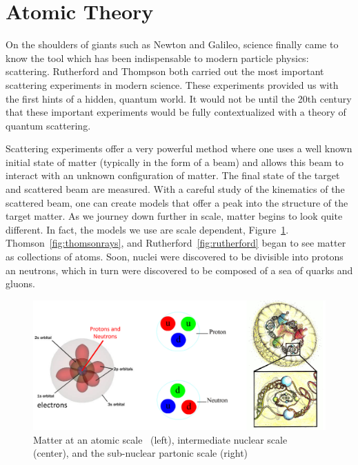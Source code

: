 \clearpage
\section{Atomic Theory}

On the shoulders of giants such as Newton and Galileo, science finally came to
know the tool which has been indispensable to modern particle physics:
scattering. Rutherford and Thompson both carried out the most important
scattering experiments in modern science. These experiments provided us with
the first hints of a hidden, quantum world. It would not be until the 20th
century that these important experiments would be fully contextualized with a
theory of quantum scattering.

Scattering experiments offer a very powerful method where one uses a well known
initial state of matter (typically in the form of a beam) and allows this beam
to interact with an unknown configuration of matter. The final state of the
target and scattered beam are measured. With a careful study of the kinematics
of the scattered beam, one can create models that offer a peak into the
structure of the target matter. As we journey down further in scale, matter
begins to look quite different.  In fact, the models we use are scale dependent,
Figure~\ref{fig:scale_of_matter}. Thomson~\ref{fig:thomsonrays}, and
Rutherford~\ref{fig:rutherford} began to see matter as collections of atoms.
Soon, nuclei were discovered to be divisible into protons an neutrons, which in
turn were discovered to be composed of a sea of quarks and gluons.

\begin{figure}[ht]
	\centering
	\includegraphics[width=\linewidth]{./figures/scale_of_matter.png}
	\caption{
    Matter at an atomic scale~\cite{Freudenrich2001} (left), intermediate
    nuclear scale~\cite{Manisearth2010} (center), and the sub-nuclear partonic
    scale (right)~\cite{Morreale2009}
	}
	\label{fig:scale_of_matter}
\end{figure}

